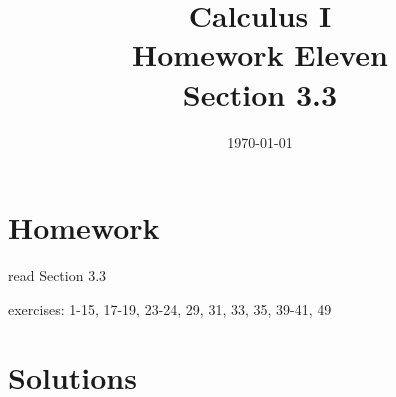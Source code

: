 \documentclass[letterpaper, landscape]{exam}
\title{Calculus I \\ Homework Eleven \\ Section 3.3}
\author{}
\date{\today}
\begin{document}
  \maketitle

  \section{Homework}
    \begin{itemize*}
      \item read Section 3.3
      \item exercises: 1-15, 17-19, 23-24, 29, 31, 33, 35, 39-41, 49
    \end{itemize*}

  \ifprintanswers

  \section{Solutions}
\end{document}
